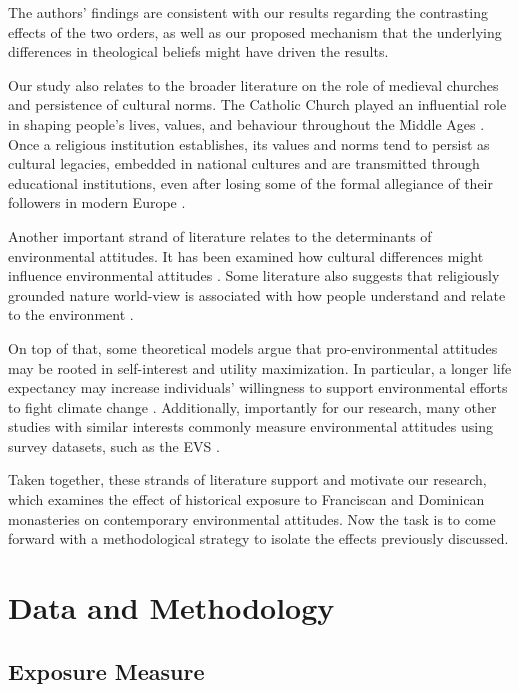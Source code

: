 \documentclass[12pt, a4paper]{article}
\begin{document}
The authors' findings are consistent with our results regarding the contrasting effects of the two orders, as well as our proposed mechanism that the underlying differences in theological beliefs might have driven the results.

Our study also relates to the broader literature on the role of medieval churches and persistence of cultural norms. The Catholic Church played an influential role in shaping people’s lives, values, and behaviour
throughout the Middle Ages \parencite{lynch2014}. Once a religious institution establishes, its values and norms tend to persist as cultural legacies, embedded in national cultures and are transmitted through educational institutions,  even after losing some of the formal allegiance of their followers in modern Europe \parencite{inglehart2000}. 

Another important strand of literature relates to the determinants of environmental attitudes. It has been examined how cultural differences might influence environmental attitudes \parencite[Chwialkowska et al., 2020; Khan et al., 2024; Yang et al., 2024; Tam, 2025, as cited in][]{behler2025}. Some literature also suggests that  religiously grounded nature world-view is associated with how people understand and relate to the environment \parencite{cohen1976}. 

On top of that, some theoretical models argue that pro-environmental attitudes may be rooted in self-interest and utility maximization. In particular, a longer life expectancy may increase individuals’ willingness to support environmental efforts to fight climate change \parencite{mariani2010}. Additionally, importantly for our research, many other studies with similar interests commonly measure environmental attitudes using survey datasets, such as the EVS \parencite{gelissen2007,behler2025}.

Taken together, these strands of literature support and motivate our research, which examines the effect of historical exposure to Franciscan and Dominican monasteries on contemporary environmental attitudes. Now the task is to come forward with a methodological strategy to isolate the effects previously discussed.

\section{Data and Methodology}

\subsection{Exposure Measure}
\end{document}
